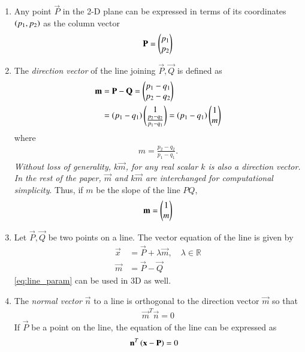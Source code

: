 \renewcommand{\theequation}{\theenumi}
\begin{enumerate}[label=\thesubsection.\arabic*.,ref=\thesubsection.\theenumi]
\item Any point $\vec{P}$ in the 2-D plane can be expressed in terms of its coordinates $\left(p_1,p_2\right)$ as the column vector
\begin{align}
\mathbf{P} = \begin{pmatrix}p_1\\p_2\end{pmatrix}
\end{align}
\item The {\em direction vector} of the line joining $\vec{P}, \vec{Q}$ is defined as 
\begin{align}
\label{eq:dir_vec}
\mathbf{m} &= \mathbf{P}-\mathbf{Q} = \begin{pmatrix}p_1-q_1\\p_2-q_2\end{pmatrix}
\\
&= \left(p_1-q_1\right)\begin{pmatrix}1 \\\frac{p_2-q_2}{p_1-q_1}\end{pmatrix} = 
\left(p_1-q_1\right)\begin{pmatrix}1 \\m\end{pmatrix}  
\end{align}
%
where 
\begin{align}
m = \frac{p_2-q_2}{p_1-q_1}.
\end{align}
{\em Without loss of generality, $k\vec{m}$, for any real scalar $k$ is also a direction vector.  In the rest of the paper, $\vec{m}$ and $k\vec{m}$ are interchanged for computational simplicity}.  Thus, if $m$ be the slope of the line $PQ$,
\begin{align}
\label{eq:dir_vec_slope}
\mathbf{m} = \begin{pmatrix}1 \\ m\end{pmatrix}
\end{align}
%
\item Let $\vec{P},\vec{Q}$ be two points on a line.  The vector equation of the line is given by
\begin{align}
\label{eq:line_param}
\vec{x} &= \vec{P} + \lambda \vec{m}, \quad \lambda \in \mathbb{R}
\\
\vec{m} &= \vec{P}-\vec{Q}
\end{align}
\eqref{eq:line_param} can be used in 3D as well.
%
\item The {\em normal vector} $\vec{n}$ to a line is orthogonal to the direction vector $\vec{m}$ so that
\begin{align}
\label{eq:line_dir_norm}
\vec{m}^T\vec{n} = 0
\end{align}
%
If $\vec{P}$ be a point on the line, the equation of the line can be expressed as
\begin{align}
\label{eq:line_norm_eq}
\vec{n}^T\brak{\vec{x}-\vec{P}} &= 0

\end{align}
\end{enumerate}
